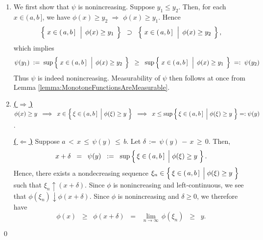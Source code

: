 \begin{enumerate}
\item
	We first show that $\psi$ is nonincreasing.
	Suppose $y_{1} \leq y_{2}$. Then, for each $x \in (\,a,b\,]$, we have
	$\phi(x) \geq y_{2}$ $\Longrightarrow$ $\phi(x) \geq y_{1}$.
	Hence
	\begin{equation*}
	\left\{\;
		x \in (\,a,b\,]
		\,\;\left\vert\;\,
			\overset{{\color{white}.}}{\phi}(x) \geq y_{1}
		\right.
		\;\right\}
	\;\; \supset \;\;
	\left\{\;
		x \in (\,a,b\,]
		\,\;\left\vert\;\,
			\overset{{\color{white}.}}{\phi}(x) \geq y_{2}
		\right.
		\;\right\},
	\end{equation*}
	which implies
	\begin{equation*}
	\psi(y_{1}) \; := \;
	\sup\left\{\;
		x \in (\,a,b\,]
		\,\;\left\vert\;\,
			\overset{{\color{white}.}}{\phi}(x) \geq y_{2}
		\right.
		\;\right\}
	\;\; \geq \;\;
	\sup\left\{\;
		x \in (\,a,b\,]
		\,\;\left\vert\;\,
			\overset{{\color{white}.}}{\phi}(x) \geq y_{1}
		\right.
		\;\right\}
	\; =: \; \psi(y_{2})
	\end{equation*}
	Thus $\psi$ is indeed nonincreasing.
	Measurability of $\psi$ then follows at once from Lemma \ref{lemma:MonotoneFunctionsAreMeasurable}.
\item
	\textbf{\underline{(\,$\Longrightarrow$\,)}}\quad
	$\phi(x) \geq y
	\;\;\Longrightarrow\;\;
		x \in \left\{\,\xi\in(\,a,b\,] \;\left\vert\; \phi(\xi) \overset{{\color{white}.}}{\geq} y\right.\,\right\}
	\;\; \Longrightarrow \;\;
		x \leq \sup\left\{\,\xi\in(\,a,b\,] \;\left\vert\; \phi(\xi) \overset{{\color{white}.}}{\geq} y\right.\,\right\} =: \psi(y)$.

	\vskip 0.2cm
	\noindent
	\textbf{\underline{(\,$\Longleftarrow$\,)}}\quad
	Suppose \;$a \,<\, x \,\leq\, \psi(y) \,\leq\, b$.\;
	Let \;$\delta \,:=\, \psi(y) \,-\, x \,\geq\, 0$. Then,
	\begin{equation*}
	x + \delta \;\;=\;\; \psi(y) \;\;:=\;\; \sup\left\{\,\xi\in(\,a,b\,] \;\left\vert\; \phi(\xi) \overset{{\color{white}.}}{\geq} y\right.\,\right\}.
	\end{equation*}
	Hence, there exists a nondecreasing sequence
	$\xi_{n} \in \left\{\,\xi\in(\,a,b\,] \;\left\vert\; \phi(\xi) \overset{{\color{white}.}}{\geq} y\right.\,\right\}$
	such that $\xi_{n} \uparrow (x+\delta)$.
	Since $\phi$ is {\color{red}nonincreasing and left-continuous}, we see that $\phi(\xi_{n}) \downarrow \phi(x+\delta)$.
	Since $\phi$ is nonincreasing and $\delta \geq 0$, we therefore have
	\begin{equation*}
	\phi(x) \;\;\geq\;\; \phi(x+\delta) \;\;=\;\; \underset{n\rightarrow\infty}{\lim}\,\phi(\xi_{n}) \;\;\geq\;\; y.
	\end{equation*}
\end{enumerate}
\qed

